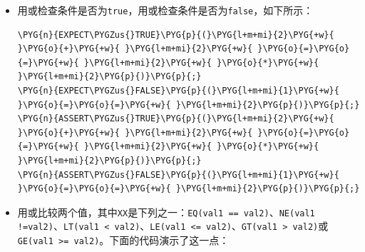 \begin{itemize}
\item 用或检查条件是否为\texttt{true}，用或检查条件是否为\texttt{false}，如下所示：



\begin{codeblockbg}
\begin{Verbatim}[commandchars=\\\{\},breaklines=true,breakanywhere=true,fontsize=\codefont,xleftmargin=17bp]
\PYG{n}{EXPECT\PYGZus{}TRUE}\PYG{p}{(}\PYG{l+m+mi}{2}\PYG{+w}{ }\PYG{o}{+}\PYG{+w}{ }\PYG{l+m+mi}{2}\PYG{+w}{ }\PYG{o}{=}\PYG{o}{=}\PYG{+w}{ }\PYG{l+m+mi}{2}\PYG{+w}{ }\PYG{o}{*}\PYG{+w}{ }\PYG{l+m+mi}{2}\PYG{p}{)}\PYG{p}{;}
\PYG{n}{EXPECT\PYGZus{}FALSE}\PYG{p}{(}\PYG{l+m+mi}{1}\PYG{+w}{ }\PYG{o}{=}\PYG{o}{=}\PYG{+w}{ }\PYG{l+m+mi}{2}\PYG{p}{)}\PYG{p}{;}
\PYG{n}{ASSERT\PYGZus{}TRUE}\PYG{p}{(}\PYG{l+m+mi}{2}\PYG{+w}{ }\PYG{o}{+}\PYG{+w}{ }\PYG{l+m+mi}{2}\PYG{+w}{ }\PYG{o}{=}\PYG{o}{=}\PYG{+w}{ }\PYG{l+m+mi}{2}\PYG{+w}{ }\PYG{o}{*}\PYG{+w}{ }\PYG{l+m+mi}{2}\PYG{p}{)}\PYG{p}{;}
\PYG{n}{ASSERT\PYGZus{}FALSE}\PYG{p}{(}\PYG{l+m+mi}{1}\PYG{+w}{ }\PYG{o}{=}\PYG{o}{=}\PYG{+w}{ }\PYG{l+m+mi}{2}\PYG{p}{)}\PYG{p}{;}
\end{Verbatim}
\end{codeblockbg}



\item 用或比较两个值，其中\texttt{XX}是下列之一：\texttt{EQ(\allowbreak{}val1 == val2)}、\texttt{NE(\allowbreak{}val1 !=}\texttt{val2)}、\texttt{LT(\allowbreak{}val1 < val2)}、\texttt{LE(\allowbreak{}val1 <\allowbreak{}= val2)}、\texttt{GT(\allowbreak{}val1 > val2)}或\texttt{GE(\allowbreak{}val1 >\allowbreak{}= val2)}。下面的代码演示了这一点：




\end{itemize}
